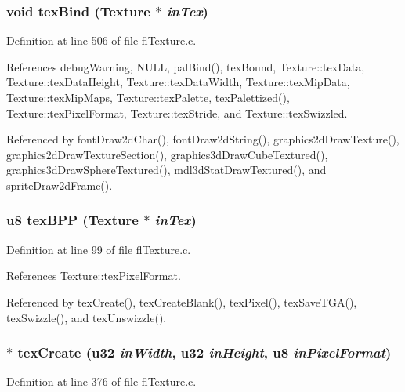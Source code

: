 \subsubsection{\setlength{\rightskip}{0pt plus 5cm}void tex\-Bind ({\bf Texture} $\ast$ {\em in\-Tex})}\label{flTexture_8c_83362b9a35e8267e6e24cc103e864cda}




Definition at line 506 of file fl\-Texture.c.

References debug\-Warning, NULL, pal\-Bind(), tex\-Bound, Texture::tex\-Data, Texture::tex\-Data\-Height, Texture::tex\-Data\-Width, Texture::tex\-Mip\-Data, Texture::tex\-Mip\-Maps, Texture::tex\-Palette, tex\-Palettized(), Texture::tex\-Pixel\-Format, Texture::tex\-Stride, and Texture::tex\-Swizzled.

Referenced by font\-Draw2d\-Char(), font\-Draw2d\-String(), graphics2d\-Draw\-Texture(), graphics2d\-Draw\-Texture\-Section(), graphics3d\-Draw\-Cube\-Textured(), graphics3d\-Draw\-Sphere\-Textured(), mdl3d\-Stat\-Draw\-Textured(), and sprite\-Draw2d\-Frame().
\subsubsection{\setlength{\rightskip}{0pt plus 5cm}u8 tex\-BPP ({\bf Texture} $\ast$ {\em in\-Tex})\hspace{0.3cm}{\tt  [inline]}}\label{flTexture_8c_6190af1ad84f1a53b7383c16fd17b59b}




Definition at line 99 of file fl\-Texture.c.

References Texture::tex\-Pixel\-Format.

Referenced by tex\-Create(), tex\-Create\-Blank(), tex\-Pixel(), tex\-Save\-TGA(), tex\-Swizzle(), and tex\-Unswizzle().
\subsubsection{$\ast$ tex\-Create (u32 {\em in\-Width}, u32 {\em in\-Height}, u8 {\em in\-Pixel\-Format})}\label{flTexture_8c_4cdb1a72f4cf0008c2cbce4ce95c99e2}




Definition at line 376 of file fl\-Texture.c.

